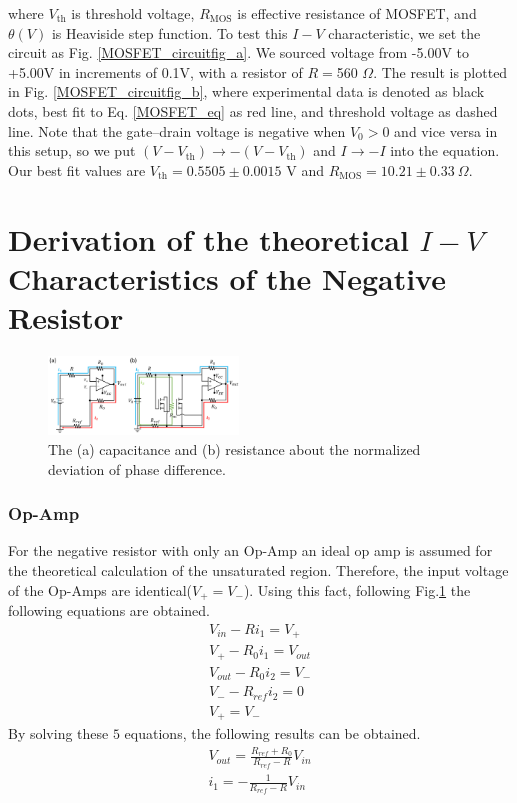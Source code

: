 \documentclass[%
 aip,
amsmath,amssymb,
reprint,
]{revtex4-1}
\begin{document}
\noindent where $V_{\textrm{th}}$ is threshold voltage, $R_{\textrm{MOS}}$ is effective resistance of MOSFET, and $\theta(V)$ is Heaviside step function.
To test this $I-V$ characteristic, we set the circuit as Fig. \ref{MOSFET_circuitfig_a}.
We sourced voltage from -5.00V to +5.00V in increments of 0.1V, with a resistor of $R=$560 $\Omega$.
The result is plotted in Fig. \ref{MOSFET_circuitfig_b}, where experimental data is denoted as black dots, best fit to Eq. \ref{MOSFET_eq} as red line, and threshold voltage as dashed line.
Note that the gate--drain voltage is negative when $V_{0}>0$ and vice versa in this setup, so we put $(V-V_{\textrm{th}})\rightarrow-(V-V_{\textrm{th}})$ and $I\rightarrow -I$ into the equation.
Our best fit values are $V_{\textrm{th}}=0.5505\pm0.0015$ V and $R_{\textrm{MOS}}=10.21\pm0.33\>\Omega$.


\section{Derivation of the theoretical $I-V$ Characteristics of the Negative Resistor}

\begin{figure}[!h]
  \centering
  \includegraphics[width=0.45\textwidth]{figures/Appendix2.png}
  \caption{The (a) capacitance and (b) resistance about the normalized deviation of phase difference. }
  \label{fig:OpAmpTheory}
\end{figure}

\subsubsection{\label{opampiv}Op-Amp}
For the negative resistor with only an Op-Amp an ideal op amp is assumed for the theoretical calculation of the unsaturated region. Therefore, the input voltage of the Op-Amps are identical($V_+=V_-$). Using this fact, following Fig.\ref{fig:OpAmpTheory} the following equations are obtained.
\begin{eqnarray}
  V_{in}-Ri_1 = V_+\\
  V_+ -R_0i_1 = V_{out}\\
  V_{out}-R_0i_2=V_-\\
  V_--R_{ref}i_2=0\\
  V_+ = V_-
\end{eqnarray}
By solving these $5$ equations, the following results can be obtained.
\begin{eqnarray}
  V_{out} = \frac{R_{ref}+R_0}{R_{ref}-R}V_{in}\\
  i_1 = -\frac{1}{R_{ref}-R}V_{in}
\end{eqnarray}
\end{document}
